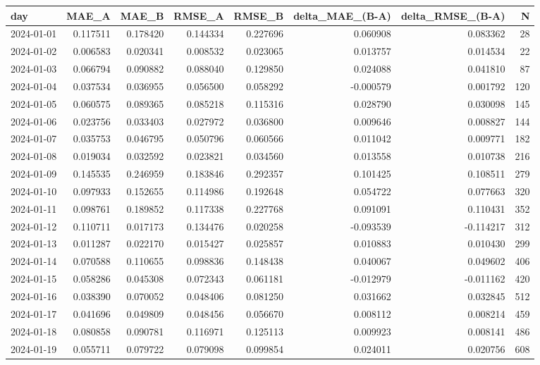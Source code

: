 \begin{tabular}{lrrrrrrr}
\toprule
day & MAE_A & MAE_B & RMSE_A & RMSE_B & delta_MAE_(B-A) & delta_RMSE_(B-A) & N \\
\midrule
2024-01-01 & 0.117511 & 0.178420 & 0.144334 & 0.227696 & 0.060908 & 0.083362 & 28 \\
2024-01-02 & 0.006583 & 0.020341 & 0.008532 & 0.023065 & 0.013757 & 0.014534 & 22 \\
2024-01-03 & 0.066794 & 0.090882 & 0.088040 & 0.129850 & 0.024088 & 0.041810 & 87 \\
2024-01-04 & 0.037534 & 0.036955 & 0.056500 & 0.058292 & -0.000579 & 0.001792 & 120 \\
2024-01-05 & 0.060575 & 0.089365 & 0.085218 & 0.115316 & 0.028790 & 0.030098 & 145 \\
2024-01-06 & 0.023756 & 0.033403 & 0.027972 & 0.036800 & 0.009646 & 0.008827 & 144 \\
2024-01-07 & 0.035753 & 0.046795 & 0.050796 & 0.060566 & 0.011042 & 0.009771 & 182 \\
2024-01-08 & 0.019034 & 0.032592 & 0.023821 & 0.034560 & 0.013558 & 0.010738 & 216 \\
2024-01-09 & 0.145535 & 0.246959 & 0.183846 & 0.292357 & 0.101425 & 0.108511 & 279 \\
2024-01-10 & 0.097933 & 0.152655 & 0.114986 & 0.192648 & 0.054722 & 0.077663 & 320 \\
2024-01-11 & 0.098761 & 0.189852 & 0.117338 & 0.227768 & 0.091091 & 0.110431 & 352 \\
2024-01-12 & 0.110711 & 0.017173 & 0.134476 & 0.020258 & -0.093539 & -0.114217 & 312 \\
2024-01-13 & 0.011287 & 0.022170 & 0.015427 & 0.025857 & 0.010883 & 0.010430 & 299 \\
2024-01-14 & 0.070588 & 0.110655 & 0.098836 & 0.148438 & 0.040067 & 0.049602 & 406 \\
2024-01-15 & 0.058286 & 0.045308 & 0.072343 & 0.061181 & -0.012979 & -0.011162 & 420 \\
2024-01-16 & 0.038390 & 0.070052 & 0.048406 & 0.081250 & 0.031662 & 0.032845 & 512 \\
2024-01-17 & 0.041696 & 0.049809 & 0.048456 & 0.056670 & 0.008112 & 0.008214 & 459 \\
2024-01-18 & 0.080858 & 0.090781 & 0.116971 & 0.125113 & 0.009923 & 0.008141 & 486 \\
2024-01-19 & 0.055711 & 0.079722 & 0.079098 & 0.099854 & 0.024011 & 0.020756 & 608 \\

\end{tabular}
